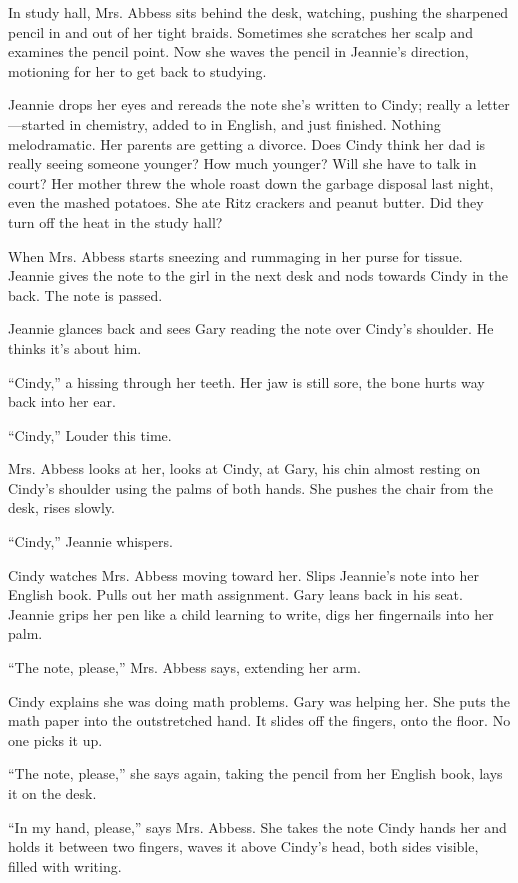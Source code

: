 \documentclass[twoside,10pt]{book}
\begin{document}
In study hall, Mrs. Abbess sits behind the desk, watching, pushing the
sharpened pencil in and out of her tight braids. Sometimes she scratches
her scalp and examines the pencil point. Now she waves the pencil in
Jeannie's direction, motioning for her to get back to studying.

Jeannie drops her eyes and rereads the note she's written to Cindy;
really a letter---started in chemistry, added to in English, and just
finished. Nothing melodramatic. Her parents are getting a divorce. Does
Cindy think her dad is really seeing someone younger? How much younger?
Will she have to talk in court? Her mother threw the whole roast down
the garbage disposal last night, even the mashed potatoes. She ate Ritz
crackers and peanut butter. Did they turn off the heat in the study
hall?

When Mrs. Abbess starts sneezing and rummaging in her purse for tissue.
Jeannie gives the note to the girl in the next desk and nods towards
Cindy in the back. The note is passed.

Jeannie glances back and sees Gary reading the note over Cindy's
shoulder. He thinks it's about him.

``Cindy,'' a hissing through her teeth. Her jaw is still sore, the bone
hurts way back into her ear.

``Cindy,'' Louder this time.

Mrs. Abbess looks at her, looks at Cindy, at Gary, his chin almost
resting on Cindy's shoulder using the palms of both hands. She pushes
the chair from the desk, rises slowly.

``Cindy,'' Jeannie whispers.

Cindy watches Mrs. Abbess moving toward her. Slips Jeannie's note into
her English book. Pulls out her math assignment. Gary leans back in his
seat. Jeannie grips her pen like a child learning to write, digs her
fingernails into her palm.

``The note, please,'' Mrs. Abbess says, extending her arm.

Cindy explains she was doing math problems. Gary was helping her. She
puts the math paper into the outstretched hand. It slides off the
fingers, onto the floor. No one picks it up.

``The note, please,'' she says again, taking the pencil from her English
book, lays it on the desk.

``In my hand, please,'' says Mrs. Abbess. She takes the note Cindy hands
her and holds it between two fingers, waves it above Cindy's head, both
sides visible, filled with writing.
\end{document}
